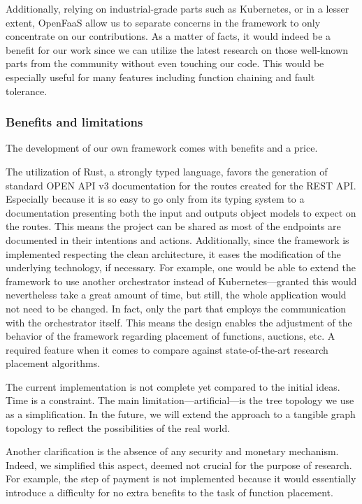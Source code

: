 Additionally, relying on industrial-grade parts such as Kubernetes, or in a lesser extent, OpenFaaS allow us to separate concerns in the framework to only concentrate on our contributions. As a matter of facts, it would indeed be a benefit for our work since we can utilize the latest research on those well-known parts from the community without even touching our code. This would be especially useful for many features including function chaining and fault tolerance.


\subsubsection{Benefits and limitations}

The development of our own framework comes with benefits and a price.

The utilization of Rust, a strongly typed language, favors the generation of standard OPEN API v3 documentation for the routes created for the \gls{REST} \gls{API}. Especially because it is so easy to go only from its typing system to a documentation presenting both the input and outputs object models to expect on the routes. This means the project can be shared as most of the endpoints are documented in their intentions and actions. Additionally, since the framework is implemented respecting the clean architecture, it eases the modification of the underlying technology, if necessary. For example, one would be able to extend the framework to use another orchestrator instead of Kubernetes—granted this would nevertheless take a great amount of time, but still, the whole application would not need to be changed. In fact, only the part that employs the communication with the orchestrator itself. This means the design enables the adjustment of the behavior of the framework regarding placement of functions, auctions, etc. A required feature when it comes to compare against state-of-the-art research placement algorithms.

The current implementation is not complete yet compared to the initial ideas. Time is a constraint. The main limitation—artificial—is the tree topology we use as a simplification. In the future, we will extend the approach to a tangible graph topology to reflect the possibilities of the real world.

Another clarification is the absence of any security and monetary mechanism. Indeed, we simplified this aspect, deemed not crucial for the purpose of research. For example, the step of payment is not implemented because it would essentially introduce a difficulty for no extra benefits to the task of function placement.

